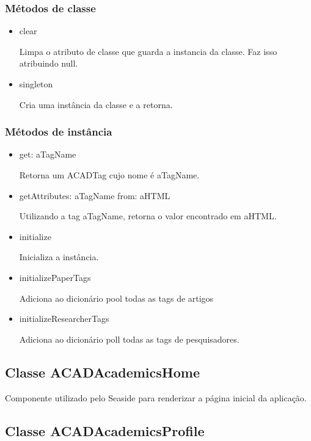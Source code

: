 \subsubsection{Métodos de classe}

\begin{itemize}

  \item clear

  Limpa o atributo de classe que guarda a instancia da classe. Faz isso atribuindo null.

  \item singleton

  Cria uma instância da classe e a retorna.

\end{itemize}

\subsubsection{Métodos de instância}

\begin{itemize}
  \item get: aTagName

  Retorna um ACADTag cujo nome é aTagName.

  \item getAttributes: aTagName from: aHTML

  Utilizando a tag aTagName, retorna o valor encontrado em aHTML.

  \item initialize

  Inicializa a instância.

  \item initializePaperTags

  Adiciona ao dicionário pool todas as tags de artigos

  \item initializeResearcherTags

  Adiciona ao dicionário poll todas as tags de pesquisadores.

\end{itemize}

\subsection{Classe ACADAcademicsHome}

Componente utilizado pelo Seaside para renderizar a página inicial da aplicação.

\subsection{Classe ACADAcademicsProfile}

